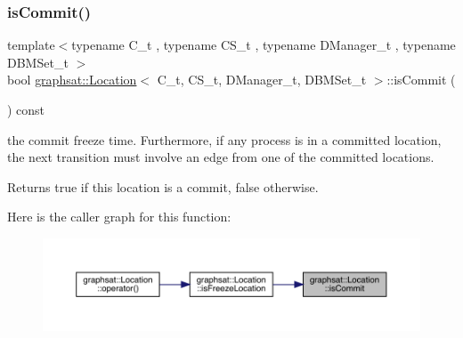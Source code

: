 \mbox{\label{classgraphsat_1_1_location_a052448735e1bad0bfb82db672a09b3a8}} 
\subsubsection{\texorpdfstring{isCommit()}{isCommit()}}
{\footnotesize\ttfamily template$<$typename C\+\_\+t , typename C\+S\+\_\+t , typename D\+Manager\+\_\+t , typename D\+B\+M\+Set\+\_\+t $>$ \\
bool \mbox{\hyperlink{classgraphsat_1_1_location}{graphsat\+::\+Location}}$<$ C\+\_\+t, C\+S\+\_\+t, D\+Manager\+\_\+t, D\+B\+M\+Set\+\_\+t $>$\+::is\+Commit (\begin{DoxyParamCaption}{ }\end{DoxyParamCaption}) const\hspace{0.3cm}{\ttfamily [inline]}}



the commit freeze time. Furthermore, if any process is in a committed location, the next transition must involve an edge from one of the committed locations. 

\begin{DoxyReturn}{Returns}
true if this location is a commit, false otherwise. 
\end{DoxyReturn}
Here is the caller graph for this function\+:
\nopagebreak
\begin{figure}[H]
\begin{center}
\leavevmode
\includegraphics[width=350pt]{classgraphsat_1_1_location_a052448735e1bad0bfb82db672a09b3a8_icgraph}
\end{center}
\end{figure}
\mbox{\label{classgraphsat_1_1_location_a061c74b681729ae1fbb38802e394eef6}} 
